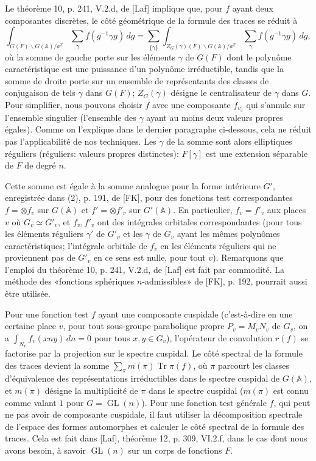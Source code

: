 \documentclass[10pt]{article}
\newcommand{\Z}{\mathbb Z}
\newcommand{\Adele}{\mathbb A}
\newcommand{\GL}{\operatorname{GL}}
\newcommand{\Tr}{\operatorname{Tr}}
\theoremstyle{deligne}
\begin{document}
Le théorème 10, p. 241, V.2.d, de [Laf] implique que, pour $f$ ayant deux composantes discrètes, le côté géométrique de la formule des traces se réduit à
\[
\int_{G(F)\backslash G(\Adele)/a^{\Z}}\sum_\gamma f(g^{-1}\gamma g)\,dg
=\sum_{\{\gamma\}}\int_{Z_G(\gamma)(F)\backslash G(\Adele)/a^{\Z}}\sum_\gamma f(g^{-1}\gamma g)\,dg,
\]
où la somme de gauche porte sur les éléments $\gamma$ de $G(F)$ dont le polynôme caractéristique est une puissance d'un polynôme irréductible, tandis que la somme de droite porte sur un ensemble de représentants des classes de conjugaison de tels $\gamma$ dans $G(F)$; $Z_G(\gamma)$ désigne le centralisateur de $\gamma$ dans $G$. Pour simplifier, nous pouvons choisir $f$ avec une composante $f_{v_3}$ qui s'annule sur l'ensemble singulier (l'ensemble des $\gamma$ ayant au moins deux valeurs propres égales). Comme on l'explique dans le dernier paragraphe ci-dessous, cela ne réduit pas l'applicabilité de nos techniques. Les $\gamma$ de la somme sont alors elliptiques réguliers (réguliers: valeurs propres distinctes): $F[\gamma]$ est une extension séparable de $F$ de degré $n$.

Cette somme est égale à la somme analogue pour la forme intérieure $G'$, enregistrée dans (2), p. 191, de [FK], pour des fonctions test correspondantes $f=\otimes f_v$ sur $G(\Adele)$ et $f'=\otimes f'_v$ sur $G'(\Adele)$. En particulier, $f_v=f'_v$ aux places $v$ où $G_v\simeq G'_v$, et $f_v,f'_v$ ont des intégrales orbitales correspondantes (pour tous les éléments réguliers $\gamma'$ de $G'_v$ et les $\gamma$ de $G_v$ ayant les mêmes polynômes caractéristiques; l'intégrale orbitale de $f_v$ en les éléments réguliers qui ne proviennent pas de $G'_v$ en ce sens est nulle, pour tout $v$). Remarquons que l'emploi du théorème 10, p. 241, V.2.d, de [Laf] est fait par commodité. La méthode des «fonctions sphériques $n$-admissibles» de [FK], p. 192, pourrait aussi être utilisée.

Pour une fonction test $f$ ayant une composante cuspidale (c'est-à-dire en une certaine place $v$, pour tout sous-groupe parabolique propre $P_v=M_vN_v$ de $G_v$, on a $\int_{N_v}f_v(xny)\,dn=0$ pour tous $x,y\in G_v$), l'opérateur de convolution $r(f)$ se factorise par la projection sur le spectre cuspidal. Le côté spectral de la formule des traces devient la somme $\sum_\pi m(\pi)\Tr\pi(f)$, où $\pi$ parcourt les classes d'équivalence des représentations irréductibles dans le spectre cuspidal de $G(\Adele)$, et $m(\pi)$ désigne la multiplicité de $\pi$ dans le spectre cuspidal ($m(\pi)$ est connu comme valant $1$ pour $G=\GL(n)$). Pour une fonction test générale $f$, qui peut ne pas avoir de composante cuspidale, il faut utiliser la décomposition spectrale de l'espace des formes automorphes et calculer le côté spectral de la formule des traces. Cela est fait dans [Laf], théorème 12, p. 309, VI.2.f, dans le cas dont nous avons besoin, à savoir $\GL(n)$ sur un corps de fonctions $F$.
\end{document}
